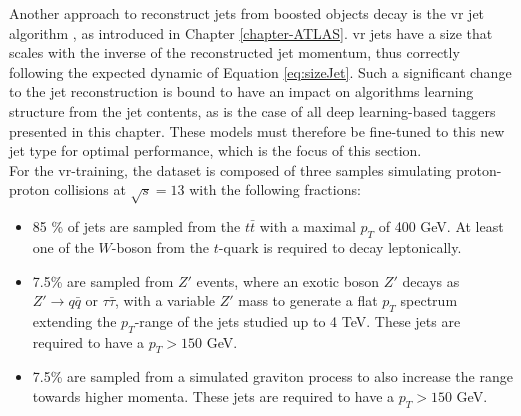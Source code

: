 Another approach to reconstruct jets from boosted objects decay is the \gls{vr} jet algorithm \cite{vrJetPaper}, as introduced in Chapter \ref{chapter-ATLAS}. \gls{vr} jets have a size that scales with the inverse of the reconstructed jet momentum, thus correctly following the expected dynamic of Equation \ref{eq:sizeJet}. Such a significant change to the jet reconstruction is bound to have an impact on algorithms learning structure from the jet contents, as is the case of all deep learning-based taggers presented in this chapter. These models must therefore be fine-tuned to this new jet type for optimal performance, which is the focus of this section. \\  %

For the \gls{vr}-training, the dataset is composed of three samples simulating proton-proton collisions at $\sqrt{s} = 13$ with the following fractions:
\begin{itemize}
  \item 85 \% of jets are sampled from the $t\bar{t}$ with a maximal $p_T$ of 400 GeV. At least one of the $W$-boson from the $t$-quark is required to decay leptonically.
  \item 7.5\% are sampled from $Z'$ events, where an exotic boson $Z'$ decays as $Z' \rightarrow q\bar{q} \textrm{ or } \tau \bar{\tau}$, with a variable $Z'$ mass to generate a flat $p_T$ spectrum extending the $p_T$-range of the jets studied up to 4 TeV. These jets are required to have a $p_T > 150$ GeV.
  \item 7.5\% are sampled from a simulated graviton process to also increase the range towards higher momenta. These jets are required to have a $p_T > 150$ GeV.
\end{itemize}

